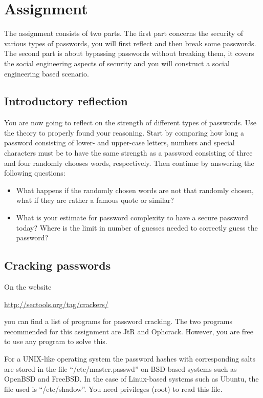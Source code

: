 \section{Assignment}
\label{sec:tasks}
The assignment consists of two parts.
The first part concerns the security of various types of passwords, you will 
first reflect and then break some passwords.
The second part is about bypassing passwords without breaking them, it covers 
the social engineering aspects of security and you will construct a social 
engineering based scenario.

\subsection{Introductory reflection}
\label{sec:reflection}
You are now going to reflect on the strength of different types of passwords.
Use the theory to properly found your reasoning.
Start by comparing how long a password consisting of lower- and upper-case 
letters, numbers and special characters must be to have the same strength as 
a password consisting of three and four randomly chooses words, respectively.
Then continue by answering the following questions:
\begin{itemize}
  \item What happens if the randomly chosen words are not that randomly chosen, 
    what if they are rather a famous quote or similar?

  \item What is your estimate for password complexity to have a secure password 
    today?
    Where is the limit in number of guesses needed to correctly guess the 
    password?
\end{itemize}

\subsection{Cracking passwords}

On the website
\begin{center}
  \url{http://sectools.org/tag/crackers/}
\end{center}
you can find a list of programs for password cracking.
The two programs recommended for this assignment are
\ac{JtR} and Ophcrack.
However, you are free to use any program to solve this.

For a UNIX-like operating system the password hashes with corresponding salts 
are stored in the file \enquote{/etc/master.passwd} on BSD-based systems such 
as OpenBSD and FreeBSD\@.
In the case of Linux-based systems such as Ubuntu, the file used is 
\enquote{/etc/shadow}.
You need privileges (root) to read this file.

